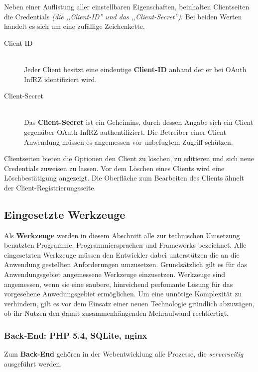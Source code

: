 \documentclass[12pt,a4paper,pointednumbers,abstracton]{scrartcl}
\begin{document}
Neben einer Auflistung aller einstellbaren Eigenschaften, beinhalten Clientseiten die Credentials \emph{(die ,,Client-ID'' und das ,,Client-Secret'')}. Bei beiden Werten handelt es sich um eine zufällige Zeichenkette.

\begin{description}
	\item[Client-ID] \hfill \\
		Jeder Client besitzt eine eindeutige \textbf{Client-ID} anhand der er bei OAuth InfRZ identifiziert wird.
	\item[Client-Secret] \hfill \\
		Das \textbf{Client-Secret} ist ein Geheimins, durch dessen Angabe sich ein Client gegenüber OAuth InfRZ authentifiziert.
		Die Betreiber einer Client Anwendung müssen es angemessen vor unbefugtem Zugriff schützen.
\end{description}

Clientseiten bieten die Optionen den Client zu löschen, zu editieren und sich neue Credentials zuweisen zu lassen.
Vor dem Löschen eines Clients wird eine Löschbestätigung angezeigt.
Die Oberfläche zum Bearbeiten des Clients ähnelt der Client-Registrierungsseite.

\subsection{Eingesetzte Werkzeuge}
\label{sec:oauth-infrz/used-tools}

Als \textbf{Werkzeuge} werden in diesem Abschnitt alle zur technischen Umsetzung benutzten Programme, Programmiersprachen und Frameworks bezeichnet.
Alle eingesetzten Werkzeuge müssen den Entwickler dabei unterstützen die an die Anwendung gestellten Anforderungen umzusetzen.
Grundsätzlich gilt es für das Anwendungsgebiet angemessene Werkzeuge einzusetzen.
Werkzeuge sind angemessen, wenn sie eine saubere, hinreichend perfomante Lösung für das vorgesehene Anwedungsgebiet ermöglichen.
Um eine unnötige Komplexität zu verhindern, gilt es vor dem Einsatz einer neuen Technologie gründlich abzuwägen, ob ihr Nutzen den damit zusammenhängenden Mehraufwand rechtfertigt.

\subsubsection{Back-End: PHP 5.4, SQLite, nginx}
\label{sec:oauth-infrz/back-end}

Zum \textbf{Back-End} gehören in der Webentwicklung alle Prozesse, die \emph{serverseitig} ausgeführt werden.
\end{document}
